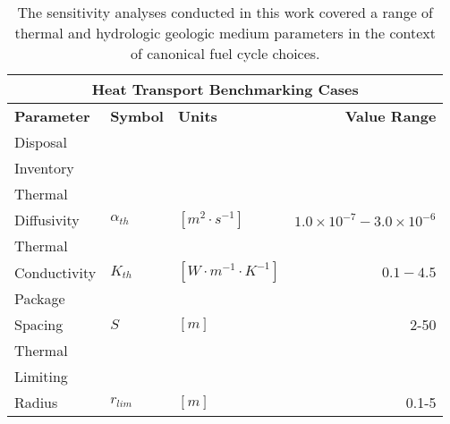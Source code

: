
\begin{table}[ht!]
\centering
\footnotesize{
\begin{tabularx}{\textwidth}{|X|l|l|r|}
\multicolumn{4}{c}{\textbf{Heat Transport Benchmarking Cases}}\\
\hline
\textbf{Parameter} & \textbf{Symbol} & \textbf{Units} & \textbf{Value Range} \\
\hline
Disposal& & & \\
Inventory& & & \\
\hline
Thermal & & & \\
Diffusivity & $\alpha_{th}$ & $[m^2\cdot s^{-1}]$ & $1.0\times10^{-7}-3.0\times10^{-6}$\\
\hline
Thermal & & & \\
Conductivity & $K_{th}$     & $[W\cdot m^{-1} \cdot K^{-1}]$ & $0.1 - 4.5$ \\
\hline
Package & & & \\
Spacing & $S$ & $[m]$ & 2-50 \\
\hline
Thermal & & & \\
Limiting & & & \\
Radius & $r_{lim}$ & $[m]$ & 0.1-5 \\
\hline
\end{tabularx}
\caption{The sensitivity analyses conducted in this work covered a range of 
thermal and hydrologic geologic medium parameters in the context of canonical fuel cycle choices.}
}
\label{tab:thermal_bench_tab}
\end{table}

